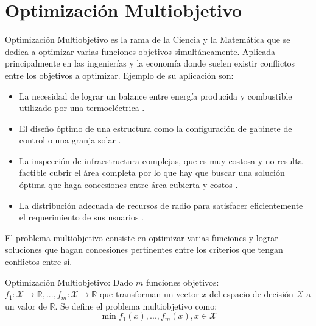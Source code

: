 \section{Optimizaci\'on Multiobjetivo}\label{background:moo}
Optimizaci\'on Multiobjetivo es la rama de la Ciencia y la Matem\'atica que se dedica a optimizar varias funciones objetivos simult\'aneamente.
Aplicada principalmente en las ingenier\'ias y la econom\'ia donde  suelen existir conflictos entre los objetivos a optimizar.
Ejemplo de su aplicaci\'on son: %
\begin{itemize}
    \item La necesidad de lograr un balance entre energ\'ia producida y combustible utilizado por una termoel\'ectrica .
    \item El dise\~no \'optimo de una estructura como la configuraci\'on de gabinete de control  o una granja solar .
    \item La inspecci\'on de infraestructura complejas, que es muy costosa y no resulta factible cubrir el \'area completa por lo que hay que buscar una soluci\'on \'optima que haga concesiones entre \'area cubierta y costos .
    \item La distribuci\'on adecuada de recursos de radio para satisfacer eficientemente el requerimiento de sus usuarios .
\end{itemize}

El problema multiobjetivo consiste en optimizar varias funciones y lograr soluciones que hagan concesiones pertinentes entre los criterios que tengan conflictos entre s\'i.
\begin{definition}{Optimizaci\'on Multiobjetivo:}
    \label{background:def:moo}
     Dado $m$ funciones objetivos: $f_1: \mathcal{X} \rightarrow \mathbb{R}, ..., f_m: \mathcal{X} \rightarrow \mathbb{R}$ que transforman un vector $x$ del espacio de decisi\'on $\mathcal{X}$ a un valor de $\mathbb{R}$. Se define el problema multiobjetivo como:
    \begin{equation*}
        \min f_1(x), ..., f_m(x), x \in \mathcal{X}
    \end{equation*}
\end{definition}

